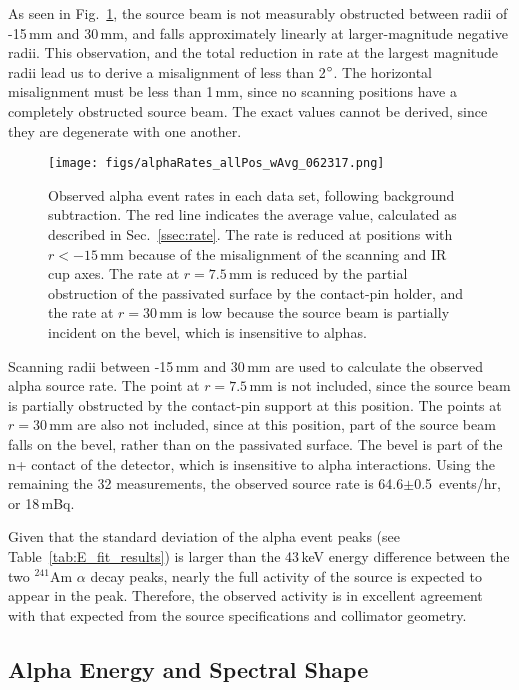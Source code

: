\documentclass[groupedaddress,rmp,amsmath,amssymb,bibnotes,altaffilletter,twocolumn]{revtex4-1}
\begin{document}
As seen in Fig.~\ref{fig:alpha_rate}, the source beam is not measurably obstructed between radii of -15\,mm and 30\,mm, and falls approximately linearly at larger-magnitude negative radii. This observation, and the total reduction in rate at the largest magnitude radii lead us to derive a misalignment of less than 2$\degree$. The horizontal misalignment must be less than 1\,mm, since no scanning positions have a completely obstructed source beam. The exact values cannot be derived, since they are degenerate with one another. 

\begin{figure}[]
 \centering
 \texttt{[image: figs/alphaRates\_allPos\_wAvg\_062317.png]}
 \caption{Observed alpha event rates in each data set, following background subtraction. The red line indicates the average value, calculated as described in Sec.~\ref{ssec:rate}. The rate is reduced at positions with $r<-15$\,mm because of the misalignment of the scanning and IR cup axes. The rate at $r=7.5$\,mm is reduced by the partial obstruction of the passivated surface by the contact-pin holder, and the rate at $r=30$\,mm is low because the source beam is partially incident on the bevel, which is insensitive to alphas.} 
 \label{fig:alpha_rate}
\end{figure}

Scanning radii between -15\,mm and 30\,mm are used to calculate the observed alpha source rate. The point at $r = 7.5$\,mm is not included, since the source beam is partially obstructed by the contact-pin support at this position. The points at $r = 30$\,mm are also not included, since at this position, part of the source beam falls on the bevel, rather than on the passivated surface. The bevel is part of the n+ contact of the detector, which is insensitive to alpha interactions. Using the remaining the 32 measurements, the observed source rate is 64.6$\pm$0.5~events/hr, or 18\,mBq.

Given that the standard deviation of the alpha event peaks (see Table~\ref{tab:E_fit_results}) is larger than the 43\,keV energy difference between the two $^{241}$Am $\alpha$ decay peaks, nearly the full activity of the source is expected to appear in the peak. Therefore, the observed activity is in excellent agreement with that expected from the source specifications and collimator geometry. 

\subsection{Alpha Energy and Spectral Shape}
\end{document}

